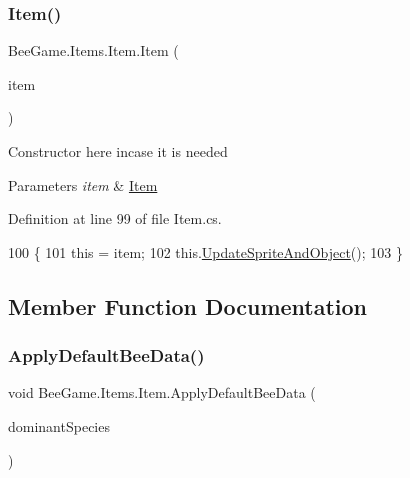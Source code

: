 \subsubsection{\texorpdfstring{Item()}{Item()}\hspace{0.1cm}{\footnotesize\ttfamily [2/2]}}
{\footnotesize\ttfamily Bee\+Game.\+Items.\+Item.\+Item (\begin{DoxyParamCaption}\item[{\hyperlink{struct_bee_game_1_1_items_1_1_item}{Item}}]{item }\end{DoxyParamCaption})}



Constructor here incase it is needed 


\begin{DoxyParams}{Parameters}
{\em item} & \hyperlink{struct_bee_game_1_1_items_1_1_item}{Item}\\
\hline
\end{DoxyParams}


Definition at line 99 of file Item.\+cs.


\begin{DoxyCode}
100         \{
101             \textcolor{keyword}{this} = item;
102             this.\hyperlink{struct_bee_game_1_1_items_1_1_item_a29abdb5010a23262e7562720bb85c171}{UpdateSpriteAndObject}();
103         \}
\end{DoxyCode}


\subsection{Member Function Documentation}
\mbox{\label{struct_bee_game_1_1_items_1_1_item_a9db12ff0f21d98b4505b661f6315a569}} 
\subsubsection{\texorpdfstring{Apply\+Default\+Bee\+Data()}{ApplyDefaultBeeData()}}
{\footnotesize\ttfamily void Bee\+Game.\+Items.\+Item.\+Apply\+Default\+Bee\+Data (\begin{DoxyParamCaption}\item[{\hyperlink{namespace_bee_game_1_1_enums_aa2ead984825678d83c42d48f6382619c}{Bee\+Species}}]{dominant\+Species }\end{DoxyParamCaption})}



